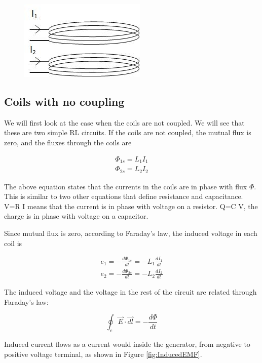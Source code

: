 \documentclass{ximera}
\begin{document}
\begin{figure}[htbp]
\begin{center}
\includegraphics[scale=0.7]{../jpg/coupledCoils.jpg}
\end{center}
\caption{}
\label{fig:CoupledCoilsAC}
\end{figure}

\subsection{Coils with no coupling}

We will first look at the case when the coils are not coupled. We will see that these are two simple RL circuits.
If the coils are not coupled, the mutual flux is zero, and the fluxes through the coils are

\begin{eqnarray}
\Phi_{1s}= L_1 I_1 \\
\Phi_{2s}= L_2 I_2
\end{eqnarray}

The above equation states that the currents in the coils are in phase with flux $\Phi$. This is similar to two other equations that define resistance and capacitance. V=R I  means that the current is in phase with voltage on a resistor. Q=C V, the charge is in phase with voltage on a capacitor. 

Since mutual flux is zero, according to Faraday's law, the induced voltage in each coil is

\begin{eqnarray}
e_1=-\frac{d\Phi_{1s}}{dt} = - L_1 \frac{dI_1}{dt}\\
e_2=-\frac{d\Phi_{2s}}{dt} = - L_2 \frac{dI_2}{dt}
\end{eqnarray}

The induced voltage and the voltage in the rest of the circuit are related through Faraday's law:

\begin{equation}
\oint_c \vec{E} \cdot \vec{dl} =  - \frac{d\Phi}{dt}
\end{equation}

Induced current flows as a current would inside the generator, from negative to positive voltage terminal, as shown in Figure \ref{fig:InducedEMF}.
\end{document}
